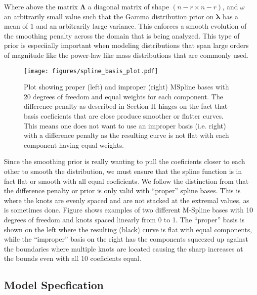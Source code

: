 Where above the matrix $\bm{\Lambda}$ a diagonal matrix of shape $(n-r \times n-r)$, and $\omega$ an arbitrarily small value such that the Gamma distribution 
prior on $\bm{\lambda}$ has a mean of 1 and an arbitrarily large variance. This enforces a smooth evolution of the smoothing penalty 
across the domain that is being analyzed. This type of prior is especiially important when modeling distributions that span large orders of magnitude like 
the power-law like mass distributions that are commonly used. 

\begin{figure*}[ht!]
    \begin{centering}
        \texttt{[image: figures/spline\_basis\_plot.pdf]}
        \caption{Plot showing proper (left) and improper (right) MSpline bases with 20 degrees of freedom and equal weights for each component. The 
            difference penalty as described in Section II hinges on the fact that basis coeficients that are close produce smoother or flatter 
            curves. This means one does not want to use an improper basis (i.e. right) with a difference penalty as the resulting curve is not flat 
            with each component having equal weights.}
        \label{fig:spline_basis}
    \end{centering}
\end{figure*}

Since the smoothing prior is really wanting to pull the coeficients closer to each other to smooth the distribution, 
we must ensure that the spline function is in fact flat or smooth with all equal coeficients. We follow the distinction from  that the difference
penalty or prior is only valid with ``proper'' spline bases. This is where the knots are evenly spaced and are not stacked at the extremal values, 
as is sometimes done. Figure shows examples of two different M-Spline bases with 10 degrees of freedom and knots spaced linearly from 0 to 1. The ``proper''
basis is shown on the left where the resulting (black) curve is flat with equal components, while the ``improper'' basis on the right has the 
components squeezed up against the boundaries where multiple knots are located causing the sharp increases at the bounds even with all 10 coeficients equal.

\subsection{Model Specfication}

